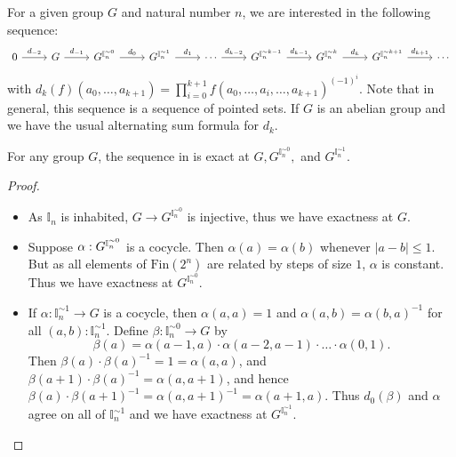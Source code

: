 \begin{definition}\label{DfnExactSequence}
For a given group $G$ and natural number $n$, we are interested in the following sequence:
\begin{equation}\label{EqSequence}
    \begin{tikzcd}
      0 \arrow[r,"d_{-2}"]& G \arrow[r,"d_{-1}"]& 
      G^{\mathbb I_n^{\sim 0}  } \arrow [r , "d_0"]     & 
      G^{\mathbb I_n^{\sim 1}  } \arrow [r , "d_1"]     & 
      \cdots                     \arrow [r , "d_{k-2}"] & 
      G^{\mathbb I_n^{\sim k-1}} \arrow [r , "d_{k-1}"] & 
      G^{\mathbb I_n^{\sim k  }} \arrow [r , "d_k"]     & 
      G^{\mathbb I_n^{\sim k+1}} \arrow [r , "d_{k+1}"] & 
      \cdots
    \end{tikzcd}
  \end{equation}
  with $d_k(f)(a_0, \hdots , a_{k+1}) = \prod\limits_{i=0}^{k+1} f(a_0 , \hdots, \widehat {a_i} , \hdots, a_{k+1})^{(-1)^i}$. Note that in general, this sequence is a sequence of pointed sets. If $G$ is an abelian group and we have the usual alternating sum formula for $d_k$. 
\end{definition}

\begin{lemma}\label{LemmaExactnessIntervalApproxFirstTerms}
  For any group $G$, the sequence in  is exact at 
  $G,G^{\mathbb I_n^{\sim 0}},$ and $G^{\mathbb I_n^{\sim 1}}$.
\end{lemma}

\begin{proof}
  \begin{itemize}
    \item
  As $\mathbb I_n$ is inhabited, $G \to G^{\mathbb I_n^{\sim0}}$ is injective, thus we have exactness at $G$. 
%
\item 
Suppose $\alpha : G^{\mathbb{I}_n^{\sim0}}$ is a cocycle. 
  Then $\alpha(a) = \alpha(b)$ whenever $|a - b|\leq 1$. 
  But as all elements of $\mathrm{Fin}(2^n)$ are related by steps of size $1$, $\alpha$ is constant.
  Thus we have exactness at $G^{\mathbb I_n^{\sim 0}}$. 
%
\item
  If $\alpha : \mathbb I_n^{\sim 1} \to G$ is a cocycle, then 
  $\alpha(a,a) = 1$ and $\alpha(a,b) = \alpha(b,a)^{-1}$ for all 
  $(a,b): \mathbb I_n^{\sim 1}$. Define 
  $\beta : \mathbb I_n^{\sim 0} \to G$ by 
 $$\beta(a) = \alpha(a-1,a)\cdot \alpha (a-2,a-1) \cdot \hdots \cdot\alpha(0,1).$$
  Then $\beta(a) \cdot \beta(a)^{-1} = 1 = \alpha(a,a)$, 
  and $\beta(a+1) \cdot \beta(a)^{-1} = \alpha(a,a+1)$, and hence 
  $\beta(a)\cdot \beta(a+1)^{-1} = \alpha(a,a+1)^{-1} = \alpha(a+1,a)$. 
  Thus $d_0(\beta) $ and $\alpha$ agree on all of $\mathbb I_n^{\sim 1}$
  and we have exactness at $G^{\mathbb I_n^{\sim1}}$.
\end{itemize}
\end{proof}

